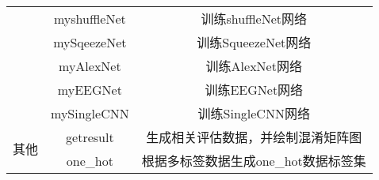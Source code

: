\begin{table}[!ht]
{\begin{tabular}{|c|c|c|}
			& myshuffleNet    & 训练shuffleNet网络                                            \\ \cline{2-3} 
			& mySqeezeNet     & 训练SqueezeNet网络                                            \\ \cline{2-3} 
			& myAlexNet       & 训练AlexNet网络                                               \\ \cline{2-3} 
			& myEEGNet        & 训练EEGNet网络                                                \\ \cline{2-3} 
			& mySingleCNN     & 训练SingleCNN网络                                             \\ \hline
			\multirow{2}{*}{其他}    & getresult       & 生成相关评估数据，并绘制混淆矩阵图                                         \\ \cline{2-3} 
			& one\_hot        & 根据多标签数据生成one\_hot数据标签集                                    \\ \hline
		\end{tabular}
	}
\end{table}

\clearpage
\endinput